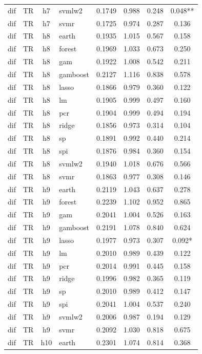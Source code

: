 \begin{ThreePartTable}
\begin{longtable}[t]{llclcccc}
dif & TR & h7 & svmlw2 & 0.1749 & 0.988 & 0.248 & 0.048**\\
dif & TR & h7 & svmr & 0.1725 & 0.974 & 0.287 & 0.136\\
\addlinespace
dif & TR & h8 & earth & 0.1935 & 1.015 & 0.567 & 0.158\\
dif & TR & h8 & forest & 0.1969 & 1.033 & 0.673 & 0.250\\
dif & TR & h8 & gam & 0.1922 & 1.008 & 0.542 & 0.211\\
dif & TR & h8 & gamboost & 0.2127 & 1.116 & 0.838 & 0.578\\
dif & TR & h8 & lasso & 0.1866 & 0.979 & 0.360 & 0.122\\
dif & TR & h8 & lm & 0.1905 & 0.999 & 0.497 & 0.160\\
dif & TR & h8 & pcr & 0.1904 & 0.999 & 0.494 & 0.194\\
dif & TR & h8 & ridge & 0.1856 & 0.973 & 0.314 & 0.104\\
dif & TR & h8 & sp & 0.1891 & 0.992 & 0.440 & 0.214\\
dif & TR & h8 & spi & 0.1876 & 0.984 & 0.360 & 0.154\\
dif & TR & h8 & svmlw2 & 0.1940 & 1.018 & 0.676 & 0.566\\
dif & TR & h8 & svmr & 0.1863 & 0.977 & 0.308 & 0.146\\
\addlinespace
dif & TR & h9 & earth & 0.2119 & 1.043 & 0.637 & 0.278\\
dif & TR & h9 & forest & 0.2239 & 1.102 & 0.952 & 0.865\\
dif & TR & h9 & gam & 0.2041 & 1.004 & 0.526 & 0.163\\
dif & TR & h9 & gamboost & 0.2191 & 1.078 & 0.840 & 0.624\\
dif & TR & h9 & lasso & 0.1977 & 0.973 & 0.307 & 0.092*\\
dif & TR & h9 & lm & 0.2010 & 0.989 & 0.439 & 0.122\\
dif & TR & h9 & pcr & 0.2014 & 0.991 & 0.445 & 0.158\\
dif & TR & h9 & ridge & 0.1996 & 0.982 & 0.365 & 0.119\\
dif & TR & h9 & sp & 0.2010 & 0.989 & 0.412 & 0.147\\
dif & TR & h9 & spi & 0.2041 & 1.004 & 0.537 & 0.240\\
dif & TR & h9 & svmlw2 & 0.2006 & 0.987 & 0.194 & 0.129\\
dif & TR & h9 & svmr & 0.2092 & 1.030 & 0.818 & 0.675\\
\addlinespace
dif & TR & h10 & earth & 0.2301 & 1.074 & 0.814 & 0.368\\

\end{longtable}
\end{ThreePartTable}
